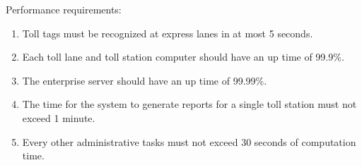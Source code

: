 Performance requirements:
\begin{enumerate}
\item Toll tags must be recognized at express lanes in at most 5 seconds.
\item Each toll lane and toll station computer should have an up time of 99.9\%.
\item The enterprise server should have an up time of 99.99\%.
\item The time for the system to generate reports for a single toll station must not exceed 1 minute.
\item Every other administrative tasks must not exceed 30 seconds of computation time.
\end{enumerate}